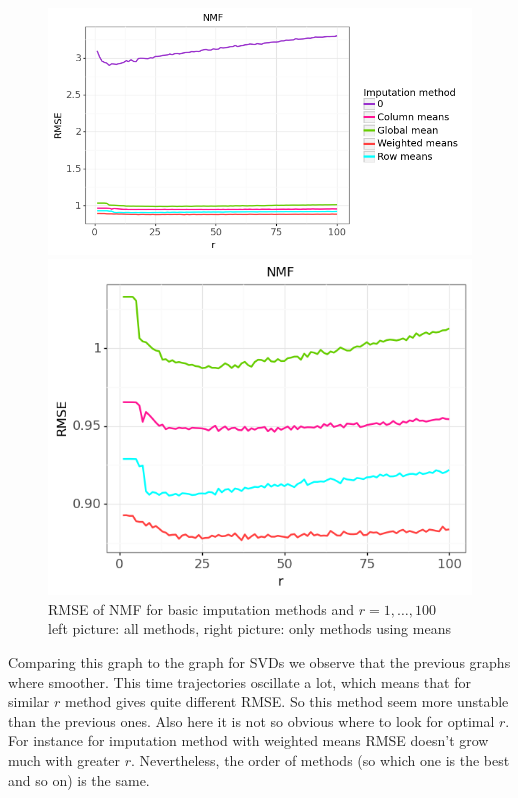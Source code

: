 \documentclass[10pt]{amsart}
\begin{document}
\begin{figure}[H]
\centering
\begin{minipage}{.63\textwidth}
  \centering
  \includegraphics[width=\textwidth]{nmf_1}
\end{minipage}%
\begin{minipage}{.4\textwidth}
  \centering
  \includegraphics[width=\textwidth]{nmf_2}
\end{minipage}
\caption{RMSE of NMF for basic imputation methods and $r = 1, \dots, 100$\\
left picture: all methods, right picture: only methods using means}
\end{figure}

Comparing this graph to the graph for SVDs we observe that the previous graphs where smoother.
This time trajectories oscillate a lot, which means that for similar $r$ method gives quite different RMSE.
So this method seem more unstable than the previous ones.
Also here it is not so obvious where to look for optimal $r$.
For instance for imputation method with weighted means RMSE doesn't grow much with greater $r$.
Nevertheless, the order of methods (so which one is the best and so on) is the same.
\end{document}
